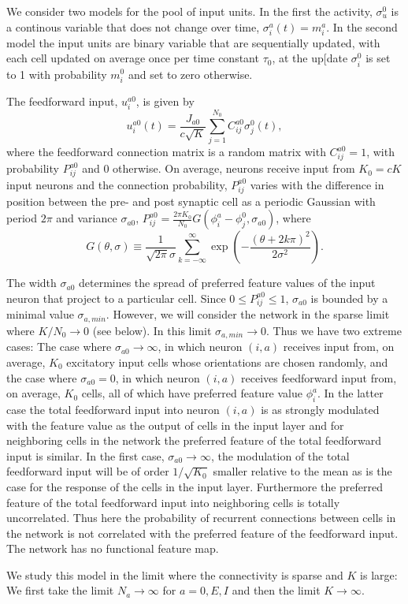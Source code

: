 We consider two models for the pool of input units. In the first the activity,
$\sigma_u^0$ is a continous variable that does not change over time, 
$\sigma_i^a(t)=m_i^a$\@. In the second model the input units are binary 
variable that are sequentially updated, with each cell updated on average once 
per time constant $\tau_0$, at the up[date $\sigma_i^0$ is set to 1 with 
probability $m_i^0$ and set to zero otherwise.

The feedforward input, $u_i^{a0}$, is given by
\begin{equation}
u_i^{a0}(t)=\frac{J_{a0}}{c\sqrt{K}}\sum_{j=1}^{N_0}C_{ij}^{a0}\sigma_j^0(t),
\end{equation}
where the feedforward connection matrix is a random matrix with $C_{ij}^{a0}=1$,
with probability $P_{ij}^{a0}$ and 0 otherwise. On average, neurons receive
input from $K_0=cK$ input neurons and the connection probability,
$P_{ij}^{a0}$ varies with the difference in position between the pre- and
post synaptic cell as a periodic Gaussian with period $2\pi$ and variance
$\sigma_{a0}$, 
$P_{ij}^{a0}=\frac{2\pi K_0}{N_0}G(\phi_i^a-\phi_j^0,\sigma_{a0})$, 
where 
\begin{equation}
G(\theta,\sigma)\equiv\frac{1}{\sqrt{2\pi}\sigma}
\sum_{k=-\infty}^{\infty}\exp\left(-\frac{(\theta+2k\pi)^2}{2\sigma^2}\right).
\end{equation}

The width $\sigma_{a0}$ determines the spread of preferred feature values of
the input neuron that project to a particular cell. Since 
$0\leq P_{ij}^{a0}\leq 1$, $\sigma_{a0}$ is bounded by a minimal value 
$\sigma_{a,min}$\@. However, we will consider the network in the sparse limit
where $K/N_0\rightarrow 0$ (see below). In this limit 
$\sigma_{a,min}\rightarrow 0$\@. Thus we have two extreme cases: The case where 
$\sigma_{a0}\rightarrow\infty$, in which neuron $(i,a)$ receives input from,
on average, $K_0$ excitatory input cells whose orientations are
chosen randomly, and the case where $\sigma_{a0}=0$, in which neuron $(i,a)$
receives feedforward input from, on average, $K_0$ cells, all of which have 
preferred feature value $\phi_i^a$\@. In the latter case the total feedforward 
input into neuron $(i,a)$ is as strongly modulated with the feature value as 
the output of cells in the input layer and for neighboring cells in the network
the preferred feature of the total feedforward input is similar. In the first 
case, $\sigma_{a0}\rightarrow\infty$, the 
modulation of the total feedforward input will be of order $1/\sqrt{K_0}$
smaller relative to the mean as is the case for the response of the 
cells in the input layer. Furthermore the preferred feature of the total 
feedforward input into neighboring cells is totally uncorrelated. Thus here 
the probability of recurrent connections between cells in the network is not 
correlated with the preferred feature of the feedforward input. The network 
has no functional feature map. 

We study this model in the limit where the connectivity is sparse and $K$ is
large: We first take the limit $N_a\rightarrow\infty$ for $a=0,E,I$ and then 
the limit $K\rightarrow \infty$\@. 
